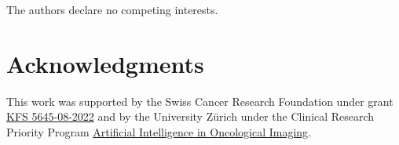 \documentclass[twocolumn]{article}
\begin{document}
The authors declare no competing interests.


\section*{Acknowledgments}

This work was supported by the Swiss Cancer Research Foundation under grant \href{https://www.krebsforschung.ch/unterstuetzen-sie-uns/stiftungen/-dl-/fileadmin/downloads/unterstuetzen-sie-uns/projekte-der-stiftung-krebsforschung-schweiz-2023.pdf}{KFS 5645-08-2022} and by the University Zürich under the Clinical Research Priority Program \href{https://www.crpp-ai-oncology.uzh.ch/en/Projects/Project-5.html}{Artificial Intelligence in Oncological Imaging}.

\printbibliography
\end{document}
